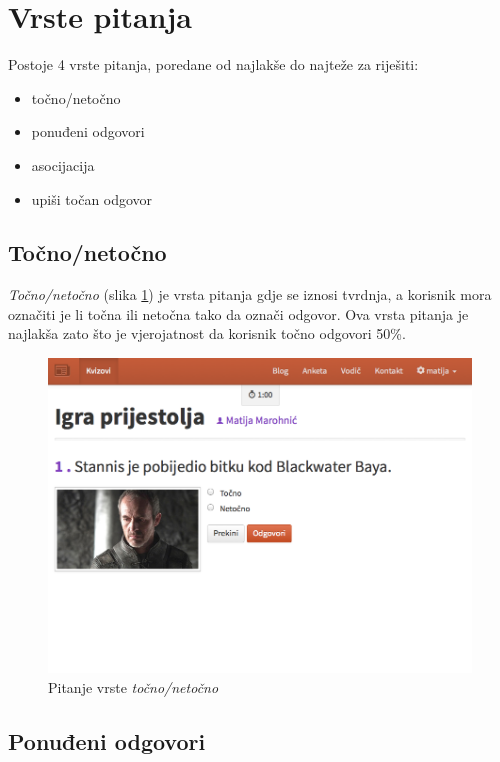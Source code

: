 \documentclass{scrreprt}
\begin{document}
\section{Vrste pitanja}

Postoje 4 vrste pitanja, poredane od najlakše do najteže za riješiti:

\begin{itemize}
  \item točno/netočno
  \item ponuđeni odgovori
  \item asocijacija
  \item upiši točan odgovor
\end{itemize}

\subsection{Točno/netočno}

\emph{Točno/netočno} (slika \ref{fig:boolean}) je vrsta pitanja gdje se iznosi
tvrdnja, a korisnik mora označiti je li točna ili netočna tako da označi
odgovor. Ova vrsta pitanja je najlakša zato što je vjerojatnost da korisnik
točno odgovori 50\%.

\begin{figure}[H]
  \includegraphics[width=\textwidth, clip=true, trim=0 7cm 0 0, fbox]{student/boolean_question}
  \caption{Pitanje vrste \emph{točno/netočno}}
  \label{fig:boolean}
\end{figure}

\subsection{Ponuđeni odgovori}
\end{document}
